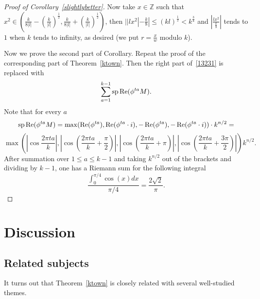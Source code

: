 \documentclass[8pt]{article}
\DeclareMathOperator{\Rre}{\operatorname{Re}}
\begin{document}
\begin{proof}[Proof of Corollary~\ref{slightlybetter}]

Now take $x \in \mathbb{Z}$ such that $x^2\in \left (\frac{k}{8|l|} - \left( \frac{k}{|l|} \right)^{\frac{1}{2}}, \frac{k}{8|l|}+ \left (\frac{k}{|l|} \right)^{\frac{1}{2}} \right)$, then
$||lx^2|-\frac{k}{8}| \leq (kl)^{\frac{1}{2}}<k^{\frac{3}{4}}$
and $|\frac{lx^2}{\frac{k}{8}}|$ tends to $1$ when $k$ tends to infinity, as desired (we put $r=\frac{x}{w}$ modulo $k$).




Now we prove the second part of Corollary. Repeat the proof of the corresponding part of Theorem~\ref{ktown}.
Then the right part of~\eqref{13231} is replaced with
\[
\sum_{a=1}^{k-1} \spp  \Rre (\phi^{ta} M) .
\]
Note that for every $a$ 
\[
\spp  \Rre (\phi^{ta} M) = \max ( \Rre (\phi^{ta}) , \Rre(\phi^{ta}\cdot i) , -\Rre(\phi^{ta}) , -\Rre(\phi^{ta}\cdot i) ) \cdot k^{n/2} =
\]
\[\max \left ( \left | \cos \frac{2\pi t a }{k} \right |,\left | \cos  \left ( \frac{2\pi t a }{k} + \frac{\pi}{2} \right ) \right |, \left | \cos  \left ( \frac{2\pi t a }{k} + \pi \right )\right |, \left | \cos  \left ( \frac{2\pi t a }{k} + \frac{3\pi}{2} \right ) \right | \right ) k^{n/2}.
\]
After summation over $1 \leq a \leq k-1$ and taking $k^{n/2}$ out of the brackets and dividing by $k-1$, one has a Riemann sum for the following integral
\[
\frac{\int_{0}^{\pi/4} \cos(x) d x }{\pi/4} = \frac{2\sqrt{2}}{\pi}.
\]


\end{proof}


    
\section{Discussion}

\subsection{Related subjects}

It turns out that Theorem~\ref{ktown} is closely related with several well-studied themes.
\end{document}
